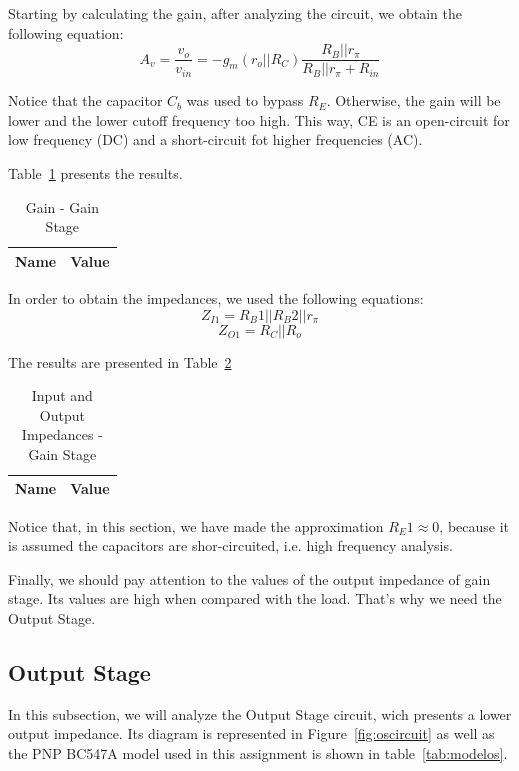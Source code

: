 Starting by calculating the gain, after analyzing the circuit, we obtain the following equation: 
\begin{equation}
	A_v=\frac{v_o}{v_{in}}=-g_m(r_o||R_C)\frac{R_B||r_\pi}{R_B||r_\pi+R_{in}}
\end{equation}

Notice that the capacitor $C_b$ was used to bypass $R_E$. Otherwise, the gain will be lower and the lower cutoff frequency too high. This way, CE is an open-circuit for low frequency (DC) and a short-circuit fot higher frequencies (AC).

Table~\ref{tab:avgs} presents the results.

\begin{table}[H]
  \centering
  \begin{tabular}{|l|r|}
     \hline    
    {\bf Name} & {\bf Value} \\ \hline   
    
  \end{tabular}
  \caption{Gain - Gain Stage}
  \label{tab:avgs}
\end{table}

In order to obtain the impedances, we used the following equations:
\begin{equation}
	Z_{I1}=R_B1||R_B2||r_\pi
\end{equation}
\begin{equation}
	Z_{O1}=R_C||R_o
\end{equation}

The results are presented in Table~\ref{tab:zgs}
\begin{table}[H]
  \centering
  \begin{tabular}{|l|r|}
     \hline    
    {\bf Name} & {\bf Value} \\ \hline   
    
  \end{tabular}
  \caption{Input and Output Impedances - Gain Stage}
  \label{tab:zgs}
\end{table}

Notice that, in this section, we have made the approximation $R_E1 \approx 0$, because it is assumed the capacitors are shor-circuited, i.e. high frequency analysis.

Finally, we should pay attention to the values of the output impedance of gain stage. Its values are high when compared with the load. That's why we need the Output Stage.
\subsection{Output Stage}
In this subsection, we will analyze the Output Stage circuit, wich presents a lower output impedance. Its diagram is represented in Figure~\ref{fig:oscircuit} as well as the PNP BC547A model used in this assignment is shown in table~\ref{tab:modelos}.

